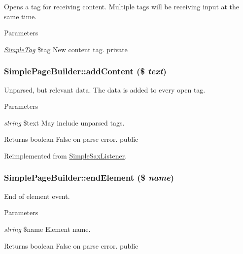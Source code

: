 \label{class_simple_page_builder_a68669a93a330af377812cc921efc94ac}
Opens a tag for receiving content. Multiple tags will be receiving input at the same time. 
\begin{DoxyParams}{Parameters}
\item[{\em \hyperlink{class_simple_tag}{SimpleTag}}]\$tag New content tag.  private \end{DoxyParams}
\hypertarget{class_simple_page_builder_a324ad1e5d69787482a64319a095e09c7}{
\subsubsection[{addContent}]{\setlength{\rightskip}{0pt plus 5cm}SimplePageBuilder::addContent (\$ {\em text})}}
\label{class_simple_page_builder_a324ad1e5d69787482a64319a095e09c7}
Unparsed, but relevant data. The data is added to every open tag. 
\begin{DoxyParams}{Parameters}
\item[{\em string}]\$text May include unparsed tags. \end{DoxyParams}
\begin{DoxyReturn}{Returns}
boolean False on parse error.  public 
\end{DoxyReturn}


Reimplemented from \hyperlink{class_simple_sax_listener_a37d761543d4dc6030888c76963cb8ed1}{SimpleSaxListener}.\hypertarget{class_simple_page_builder_a9c074127728a8588dac8dbf5c0f05439}{
\subsubsection[{endElement}]{\setlength{\rightskip}{0pt plus 5cm}SimplePageBuilder::endElement (\$ {\em name})}}
\label{class_simple_page_builder_a9c074127728a8588dac8dbf5c0f05439}
End of element event. 
\begin{DoxyParams}{Parameters}
\item[{\em string}]\$name Element name. \end{DoxyParams}
\begin{DoxyReturn}{Returns}
boolean False on parse error.  public 
\end{DoxyReturn}


